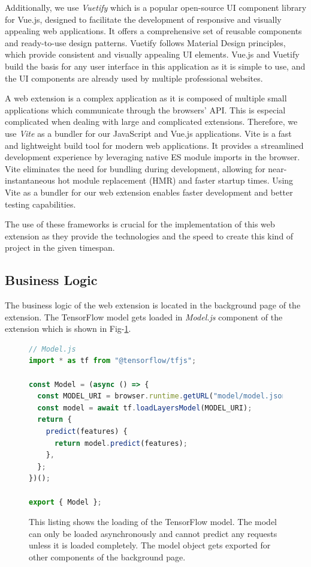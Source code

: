 Additionally, we use \emph{Vuetify} \cite{vuetify} which is a popular open-source UI component library for Vue.js, designed
to facilitate the development of responsive and visually appealing web applications. It offers a comprehensive set of reusable
components and ready-to-use design patterns. Vuetify follows Material Design principles, which provide consistent and visually
appealing UI elements. Vue.js and Vuetify build the basis for any user interface in this application as it is simple to use, and 
the UI components are already used by multiple professional websites.

A web extension is a complex application as it is composed of multiple small applications which communicate through the browsers' API. This
is especial complicated when dealing with large and complicated extensions. Therefore, we use \emph{Vite} \cite{vite} as a bundler
for our JavaScript and Vue.js applications. Vite is a fast and lightweight build tool for modern web applications. It provides
a streamlined development experience by leveraging native ES module imports in the browser. Vite eliminates the need for
bundling during development, allowing for near-instantaneous hot module replacement (HMR) and faster startup times. Using Vite as a bundler
for our web extension enables faster development and better testing capabilities.

The use of these frameworks is crucial for the implementation of this web extension as they provide the technologies and the speed to create
this kind of project in the given timespan. 
\subsection{Business Logic}
The business logic of the web extension is located in the background page of the extension. 
The TensorFlow model gets loaded in \emph{Model.js} component of the extension which is shown in Fig-\ref{fig:Model}.
\begin{figure}[ht!]
  \begin{lstlisting}[language=JavaScript]
// Model.js
import * as tf from "@tensorflow/tfjs";

const Model = (async () => {
  const MODEL_URI = browser.runtime.getURL("model/model.json");
  const model = await tf.loadLayersModel(MODEL_URI);
  return {
    predict(features) {
      return model.predict(features);
    },
  };
})();

export { Model };
  \end{lstlisting}
  \caption{This listing shows the loading of the TensorFlow model. The model can only be loaded asynchronously and cannot predict any 
  requests unless it is loaded completely. The model object gets exported for other components of the background page.}
  \label{fig:Model}
\end{figure}

